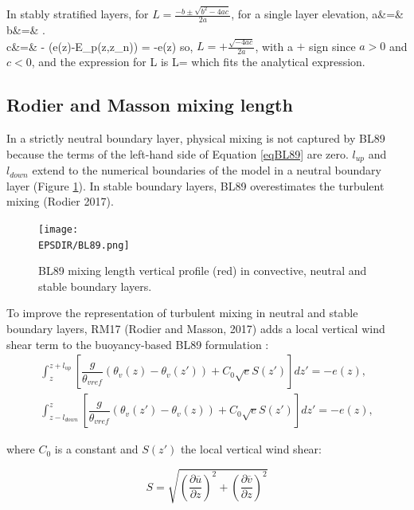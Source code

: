In stably stratified layers, for $ L= \frac{-b \pm \sqrt{b^2-4ac}}{2a}$,
for a single layer elevation,
\ba
a&=&   \\
b&=& \beta  {}. \\
c&=& - (e(z)-E_p(z,z_n)) = -e(z)
\ea
\noindent
so, $ L= + \frac{\sqrt{-4ac}}{2a}$, with a $+$ sign since $a>0$ and $c<0$,
and the expression for L is
\be
L=
\ee
which fits the analytical expression.

\subsection{Rodier and Masson mixing length}
In a strictly neutral boundary layer, physical mixing is not captured by BL89 because the terms of the left-hand side of Equation \ref{eqBL89} are zero. $l_{up}$ and $l_{down}$ extend to the numerical boundaries of the model in a neutral boundary layer (Figure \ref{fig:BL89}). In stable boundary layers, BL89 overestimates the turbulent mixing (Rodier 2017).

\begin{figure}[!ht]
\centering
\noindent\texttt{[image: \\EPSDIR/BL89.png]}
\caption{BL89 mixing length vertical profile (red) in convective, neutral and stable boundary layers.}
\label{fig:BL89}
\end{figure}

To improve the representation of turbulent mixing in neutral and stable boundary layers, RM17 (Rodier and Masson, 2017) adds a local vertical wind shear term to the buoyancy-based BL89 formulation :
\begin{equation}
\begin{split}
\int_z^{z+l_{up}} \left[\dfrac{g}{\theta_{vref}}(\theta_v (z) - \theta_v (z')) + C_0 \sqrt{e}S(z')\right]dz' = - e(z), \\
\int_{z-l_{down}}^z \left[\dfrac{g}{\theta_{vref}}(\theta_v (z') - \theta_v (z))+ C_0 \sqrt{e}S(z')\right]dz' = - e(z),
\end{split}
\label{eq:BS}
\end{equation}

where $C_0$ is a constant and $S(z')$ the local vertical wind shear:

\begin{equation}
S = \sqrt{\left(\dfrac{\partial \overline{u}}{\partial z}\right)^2 + \left(\dfrac{\partial \overline{v}}{\partial z}\right)^2}
\end{equation}


